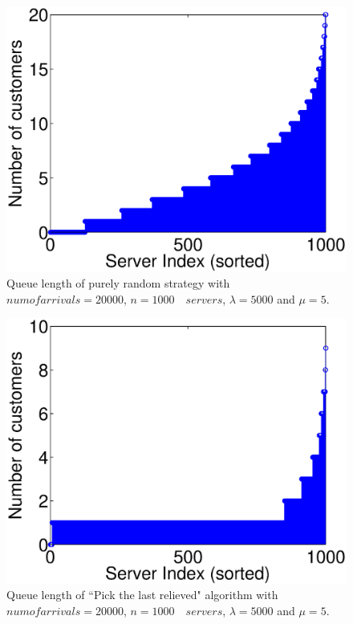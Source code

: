 \documentclass[a4paper,english,12pt]{article}
\begin{document}
\begin{figure}[H]
\centering
\includegraphics[scale=0.55]{Random_quelength.eps}
\caption{Queue length of purely random strategy with $num of arrivals = 20000$, $n = 1000 \quad servers$, $\lambda = 5000$ and $\mu = 5$.} 
\end{figure}


\begin{figure}[H]
\centering
\includegraphics[scale=0.55]{Lastreleiving_quelength.eps}
\caption{Queue length of ``Pick the last relieved" algorithm with $num of arrivals = 20000$, $n = 1000 \quad servers$, $\lambda = 5000$ and $\mu = 5$.} 
\end{figure}
\end{document}
